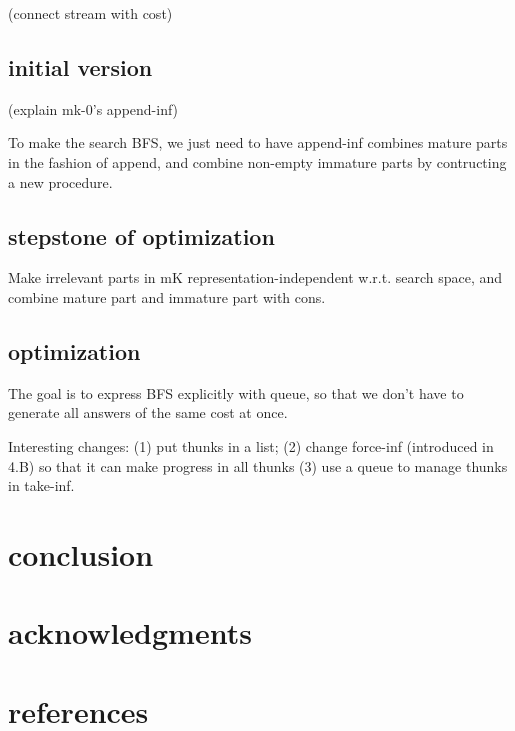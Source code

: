 \documentclass[format=acmlarge, review=true, authordraft=true]{acmart}
\begin{document}
(connect stream with cost)

\subsection{initial version}

(explain mk-0's append-inf)



To make the search BFS, we just need to have append-inf combines mature parts in the fashion of append, and combine non-empty immature parts by contructing a new procedure.



\subsection{stepstone of optimization}

Make irrelevant parts in mK representation-independent w.r.t. search space, and combine mature part and immature part with cons.

\subsection{optimization}

The goal is to express BFS explicitly with queue, so that we don’t have to generate all answers of the same cost at once.

Interesting changes: (1) put thunks in a list; (2) change force-inf (introduced in 4.B) so that it can make progress in all thunks (3) use a queue to manage thunks in take-inf.

\section{conclusion}

\section*{acknowledgments}

\section*{references}
\end{document}
